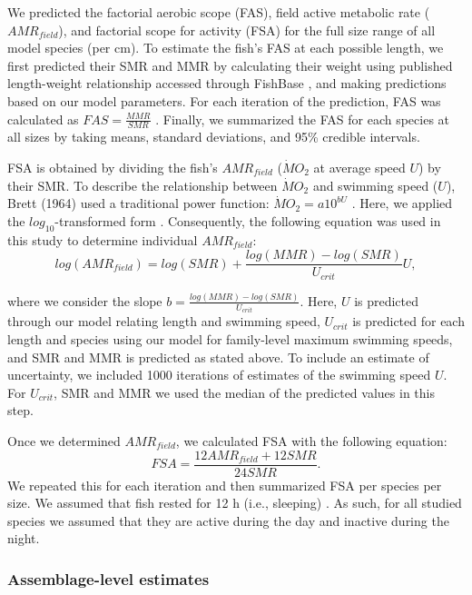 \documentclass[
]{article}
\begin{document}
We predicted the factorial aerobic scope (FAS), field active metabolic
rate (\(AMR_{field}\)), and factorial scope for activity (FSA) for the
full size range of all model species (per cm). To estimate the fish's
FAS at each possible length, we first predicted their SMR and MMR by
calculating their weight using published length-weight relationship
accessed through FishBase \citep{Froese2014}, and making predictions
based on our model parameters. For each iteration of the prediction, FAS
was calculated as \(FAS = \frac{MMR}{SMR}\) \citep{Fry1947, Killen2016}.
Finally, we summarized the FAS for each species at all sizes by taking
means, standard deviations, and 95\% credible intervals.

FSA is obtained by dividing the fish's \(AMR_{field}\) (\(\dot{M}O_{2}\)
at average speed \(U\)) by their SMR. To describe the relationship
between \(\dot{M}O_{2}\) and swimming speed (\(U\)), Brett (1964)
\citep{Brett1964} used a traditional power function:
\(\dot{M}O_{2} = a10^{bU}\) . Here, we applied the
\(log_{10}\)-transformed form \citep{Korsmeyer2002}. Consequently, the
following equation was used in this study to determine individual
\(AMR_{field}\):
\[log(AMR_{field}) = log(SMR) + \frac{log(MMR) - log(SMR)}{U_{crit}} U,\]

where we consider the slope
\(b = \frac{log(MMR) - log(SMR)}{U_{crit}}\). Here, \(U\) is predicted
through our model relating length and swimming speed, \(U_{crit}\) is
predicted for each length and species using our model for family-level
maximum swimming speeds, and SMR and MMR is predicted as stated above.
To include an estimate of uncertainty, we included 1000 iterations of
estimates of the swimming speed \(U\). For \(U_{crit}\), SMR and MMR we
used the median of the predicted values in this step.

Once we determined \(AMR_{field}\), we calculated FSA with the following
equation: \[FSA = {\frac{12 AMR_{field} + 12 SMR}{24 SMR}}.\] We
repeated this for each iteration and then summarized FSA per species per
size. We assumed that fish rested for 12 h (i.e., sleeping)
\citep{Marshall1972}. As such, for all studied species we assumed that
they are active during the day and inactive during the night.

\hypertarget{assemblage-level-estimates}{%
\subsubsection{Assemblage-level
estimates}\label{assemblage-level-estimates}}
\end{document}
